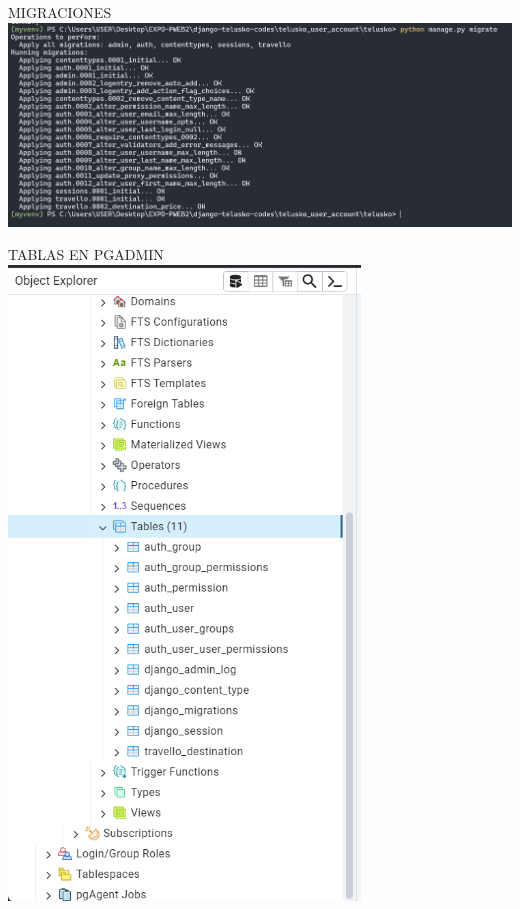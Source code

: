 \documentclass{article}
\begin{document}
        \item MIGRACIONES
        \newline\newline\newline
        \includegraphics[width=1\textwidth,keepaspectratio]{IMAGENES/migracion de tablas.png}

        \item TABLAS EN PGADMIN
        \newline\newline\newline
        \includegraphics[width=0.7\textwidth,keepaspectratio]{IMAGENES/tablas.png}
\end{document}
